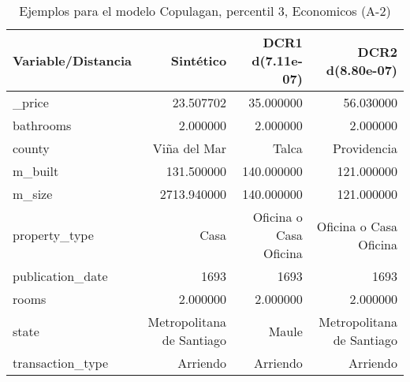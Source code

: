 \begin{table}[H]
\centering
\fontsize{10}{14}\selectfont
\caption{Ejemplos para el modelo Copulagan, percentil 3, Economicos (A-2)}
\label{table-example-economicos-a-2-copulagan-3p}
\begin{tabular}{|l|r|r|r|}
\hline
\rowcolor[gray]{0.8}
Variable/Distancia & Sintético & DCR1 d(7.11e-07) & DCR2 d(8.80e-07) \\
\hline \_price & \cellcolor[rgb]{0.9, 0.54, 0.52} 23.507702 & 35.000000 & 56.030000 \\
\hline bathrooms & \cellcolor[rgb]{0.9, 0.54, 0.52} 2.000000 & \cellcolor[rgb]{0.9, 0.54, 0.52} 2.000000 & \cellcolor[rgb]{0.9, 0.54, 0.52} 2.000000 \\
\hline county & \cellcolor[rgb]{0.9, 0.54, 0.52} Viña del Mar & Talca & Providencia \\
\hline m\_built & \cellcolor[rgb]{0.9, 0.54, 0.52} 131.500000 & 140.000000 & 121.000000 \\
\hline m\_size & \cellcolor[rgb]{0.9, 0.54, 0.52} 2713.940000 & 140.000000 & 121.000000 \\
\hline property\_type & \cellcolor[rgb]{0.9, 0.54, 0.52} Casa & Oficina o Casa Oficina & Oficina o Casa Oficina \\
\hline publication\_date & \cellcolor[rgb]{0.9, 0.54, 0.52} 1693 & \cellcolor[rgb]{0.9, 0.54, 0.52} 1693 & \cellcolor[rgb]{0.9, 0.54, 0.52} 1693 \\
\hline rooms & \cellcolor[rgb]{0.9, 0.54, 0.52} 2.000000 & \cellcolor[rgb]{0.9, 0.54, 0.52} 2.000000 & \cellcolor[rgb]{0.9, 0.54, 0.52} 2.000000 \\
\hline state & \cellcolor[rgb]{0.9, 0.54, 0.52} Metropolitana de Santiago & Maule & \cellcolor[rgb]{0.9, 0.54, 0.52} Metropolitana de Santiago \\
\hline transaction\_type & \cellcolor[rgb]{0.9, 0.54, 0.52} Arriendo & \cellcolor[rgb]{0.9, 0.54, 0.52} Arriendo & \cellcolor[rgb]{0.9, 0.54, 0.52} Arriendo \\
\hline
\end{tabular}
\end{table}
